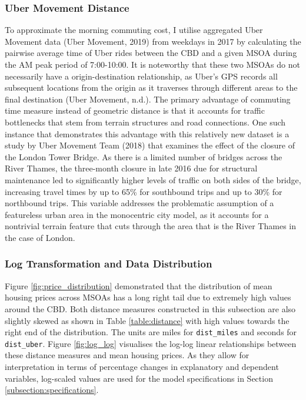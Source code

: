 \documentclass{article}
\begin{document}
\subsubsection{Uber Movement Distance}
To approximate the morning commuting cost, I utilise aggregated Uber Movement data (Uber Movement, 2019) from weekdays in 2017 by calculating the pairwise average time of Uber rides between the CBD and a given MSOA during the AM peak period of 7:00-10:00. It is noteworthy that these two MSOAs do not necessarily have a origin-destination relationship, as Uber's GPS records all subsequent locations from the origin as it traverses through different areas to the final destination (Uber Movement, n.d.). The primary advantage of commuting time measure instead of geometric distance is that it accounts for traffic bottlenecks that stem from terrain structures and road connections. One such instance that demonstrates this advantage with this relatively new dataset is a study by Uber Movement Team (2018) that examines the effect of the closure of the London Tower Bridge. As there is a limited number of bridges across the River Thames, the three-month closure in late 2016 due for structural maintenance led to significantly higher levels of traffic on both sides of the bridge, increasing travel times by up to 65\% for southbound trips and up to 30\% for northbound trips. This variable addresses the problematic assumption of a featureless urban area in the monocentric city model, as it accounts for a nontrivial terrain feature that cuts through the area that is the River Thames in the case of London. 

\subsubsection{Log Transformation and Data Distribution}
Figure \ref{fig:price_distribution} demonstrated that the distribution of mean housing prices across MSOAs has a long right tail due to extremely high values around the CBD. Both distance measures constructed in this subsection are also slightly skewed as shown in Table \ref{table:distance} with high values towards the right end of the distribution. The units are miles for \texttt{dist\_miles} and seconds for \texttt{dist\_uber}. Figure \ref{fig:log_log} visualises the log-log linear relationships between these distance measures and mean housing prices. As they allow for interpretation in terms of percentage changes in explanatory and dependent variables, log-scaled values are used for the model specifications in Section \ref{subsection:specifications}.
\end{document}

